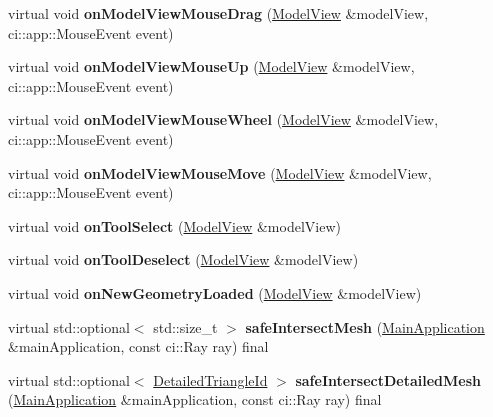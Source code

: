 \begin{DoxyCompactItemize}
\mbox{\label{classpepr3d_1_1_tool_a56cc05810dfb90d78b0c1388f710a445}} 
virtual void {\bfseries on\+Model\+View\+Mouse\+Drag} (\mbox{\hyperlink{classpepr3d_1_1_model_view}{Model\+View}} \&model\+View, ci\+::app\+::\+Mouse\+Event event)
\item 
\mbox{\label{classpepr3d_1_1_tool_a3d6d4e593753eba998b2a6d6fb49c5af}} 
virtual void {\bfseries on\+Model\+View\+Mouse\+Up} (\mbox{\hyperlink{classpepr3d_1_1_model_view}{Model\+View}} \&model\+View, ci\+::app\+::\+Mouse\+Event event)
\item 
\mbox{\label{classpepr3d_1_1_tool_aa1aae7ecebb6d2e63dfa61d08ff022ae}} 
virtual void {\bfseries on\+Model\+View\+Mouse\+Wheel} (\mbox{\hyperlink{classpepr3d_1_1_model_view}{Model\+View}} \&model\+View, ci\+::app\+::\+Mouse\+Event event)
\item 
\mbox{\label{classpepr3d_1_1_tool_a25a3db1cbb37241f473e009ac702d867}} 
virtual void {\bfseries on\+Model\+View\+Mouse\+Move} (\mbox{\hyperlink{classpepr3d_1_1_model_view}{Model\+View}} \&model\+View, ci\+::app\+::\+Mouse\+Event event)
\item 
\mbox{\label{classpepr3d_1_1_tool_a139c1e72bd9eada36ce660e1fbf10c6b}} 
virtual void {\bfseries on\+Tool\+Select} (\mbox{\hyperlink{classpepr3d_1_1_model_view}{Model\+View}} \&model\+View)
\item 
\mbox{\label{classpepr3d_1_1_tool_aafba698d859abbc2b1dc48a38ca24d36}} 
virtual void {\bfseries on\+Tool\+Deselect} (\mbox{\hyperlink{classpepr3d_1_1_model_view}{Model\+View}} \&model\+View)
\item 
\mbox{\label{classpepr3d_1_1_tool_ac94e48ba121b7f4e4bf897de871ad479}} 
virtual void {\bfseries on\+New\+Geometry\+Loaded} (\mbox{\hyperlink{classpepr3d_1_1_model_view}{Model\+View}} \&model\+View)
\item 
\mbox{\label{classpepr3d_1_1_tool_a2420df1e8a95c66a882a923158084020}} 
virtual std\+::optional$<$ std\+::size\+\_\+t $>$ {\bfseries safe\+Intersect\+Mesh} (\mbox{\hyperlink{classpepr3d_1_1_main_application}{Main\+Application}} \&main\+Application, const ci\+::\+Ray ray) final
\item 
\mbox{\label{classpepr3d_1_1_tool_a2645ac765f26cbda2ab9c818a362912f}} 
virtual std\+::optional$<$ \mbox{\hyperlink{structpepr3d_1_1_detailed_triangle_id}{Detailed\+Triangle\+Id}} $>$ {\bfseries safe\+Intersect\+Detailed\+Mesh} (\mbox{\hyperlink{classpepr3d_1_1_main_application}{Main\+Application}} \&main\+Application, const ci\+::\+Ray ray) final
\end{DoxyCompactItemize}


